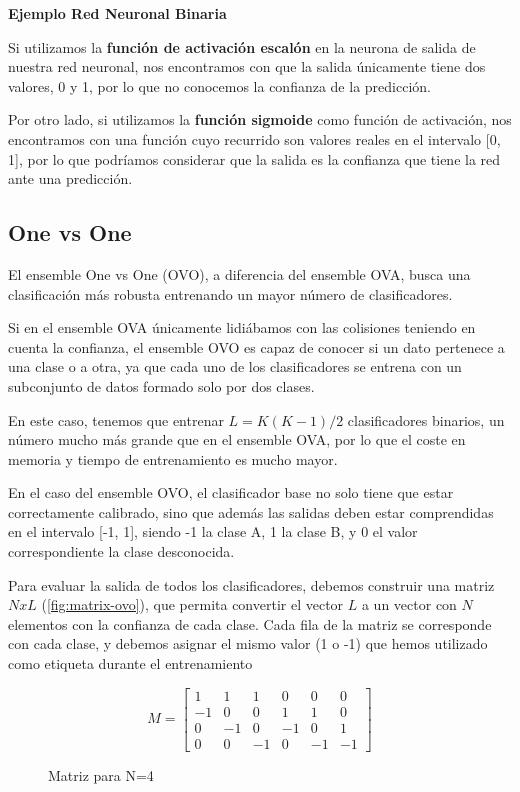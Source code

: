 \textbf{Ejemplo Red Neuronal Binaria}

Si utilizamos la \textbf{función de activación escalón} en la neurona de
salida de nuestra red neuronal, nos encontramos con que la salida
únicamente tiene dos valores, 0 y 1, por lo que no conocemos la
confianza de la predicción.

Por otro lado, si utilizamos la \textbf{función sigmoide} como función
de activación, nos encontramos con una función cuyo recurrido son
valores reales en el intervalo {[}0, 1{]}, por lo que podríamos
considerar que la salida es la confianza que tiene la red ante una
predicción.

\hypertarget{one-vs-one}{%
\subsection{One vs One}\label{one-vs-one}}

El ensemble One vs One (OVO), a diferencia del ensemble OVA, busca una
clasificación más robusta entrenando un mayor número de clasificadores.

Si en el ensemble OVA únicamente lidiábamos con las colisiones teniendo en cuenta
la confianza, el ensemble OVO es capaz de conocer si un dato pertenece a
una clase o a otra, ya que cada uno de los clasificadores se entrena con
un subconjunto de datos formado solo por dos clases.

En este caso, tenemos que entrenar $L = K(K-1)/2$ clasificadores binarios,
un número mucho más grande que en el ensemble OVA, por lo que el coste
en memoria y tiempo de entrenamiento es mucho mayor.

En el caso del ensemble OVO, el clasificador base no solo tiene que
estar correctamente calibrado, sino que además las salidas deben estar
comprendidas en el intervalo {[}-1, 1{]}, siendo -1 la clase A, 1 la
clase B, y 0 el valor correspondiente la clase desconocida.

Para evaluar la salida de todos los clasificadores, debemos construir
una matriz $N x L$ (\ref{fig:matrix-ovo}), que permita convertir el vector $L$ a un vector con $N$
elementos con la confianza de cada clase. Cada fila de la matriz se
corresponde con cada clase, y debemos asignar el mismo valor (1 o -1)
que hemos utilizado como etiqueta durante el entrenamiento
\begin{figure}
\centering
$$
M = 
\begin{bmatrix}
1 & 1 & 1 & 0 & 0 & 0 \\
-1 & 0 & 0 &  1 & 1 & 0 \\
0 & -1 & 0 & -1 & 0 & 1 \\
0 & 0 & -1 & 0 & -1 & -1 
\label{fig:matrix-ovo}
\end{bmatrix}

$$
\caption{Matriz para N=4}
\end{figure}



